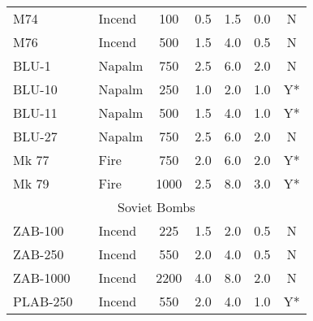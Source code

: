 \begin{twocolumntablefloat}
\begin{twocolumntable}
\begin{tabular}{lllccccc}
M74     &      &Incend & \phantom{0}100 & 0.5 & \phantom{0}1.5 & \phantom{0}0.0 & N\\
M76     &      &Incend & \phantom{0}500 & 1.5 & \phantom{0}4.0 & \phantom{0}0.5 & N\\
BLU-1   &      & Napalm & \phantom{0}750 & 2.5 & \phantom{0}6.0 & \phantom{0}2.0 & N\\
BLU-10  &      & Napalm & \phantom{0}250 & 1.0 & \phantom{0}2.0 & \phantom{0}1.0 & Y*\\
BLU-11  &      & Napalm & \phantom{0}500 & 1.5 & \phantom{0}4.0 & \phantom{0}1.0 & Y*\\
BLU-27  &      & Napalm & \phantom{0}750 & 2.5 & \phantom{0}6.0 & \phantom{0}2.0 & N\\
Mk 77   &      &Fire   & \phantom{0}750 & 2.0 & \phantom{0}6.0 & \phantom{0}2.0 & Y*\\
Mk 79   &      &Fire   & \phantom{}1000 & 2.5 & \phantom{0}8.0 & \phantom{0}3.0 & Y*\\
\midrule
\multicolumn{8}{c}{Soviet    Bombs}\\
\midrule
ZAB-100 &   &Incend & \phantom{0}225 & 1.5 & \phantom{0}2.0 & \phantom{0}0.5 & N\\
ZAB-250 &   &Incend & \phantom{0}550 & 2.0 & \phantom{0}4.0 & \phantom{0}0.5 & N\\
ZAB-1000 &   &Incend & \phantom{}2200 & 4.0 & \phantom{0}8.0 & \phantom{0}2.0 & N\\
PLAB-250 &   &Incend & \phantom{0}550 & 2.0 & \phantom{0}4.0 & \phantom{0}1.0 & Y*\\
\bottomrule
\end{tabular}
\end{twocolumntable}
\end{twocolumntablefloat}